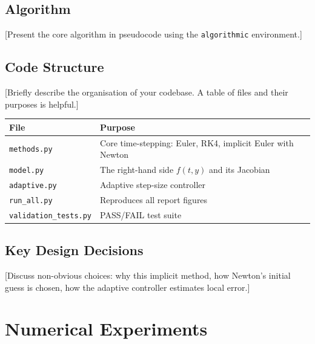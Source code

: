 \documentclass[11pt,a4paper]{article}
\theoremstyle{definition}
\theoremstyle{remark}
\begin{document}
\subsection{Algorithm}
[Present the core algorithm in pseudocode using the \texttt{algorithmic}
environment.]

\begin{algorithm}[H]
\caption{[Your method name]}
\label{alg:main}
\begin{algorithmic}[1]
\State [Step 1]
    \If{[condition]}
        \State [Action]
    \EndIf
\EndFor
\State \Return [result]
\end{algorithmic}
\end{algorithm}

\subsection{Code Structure}
[Briefly describe the organisation of your codebase. A table of files and their
purposes is helpful.]

\begin{table}[H]
\centering
\begin{tabular}{ll}
\toprule
\textbf{File} & \textbf{Purpose} \\
\midrule
\texttt{methods.py} & Core time-stepping: Euler, RK4, implicit Euler with Newton \\
\texttt{model.py} & The right-hand side $f(t,y)$ and its Jacobian \\
\texttt{adaptive.py} & Adaptive step-size controller \\
\texttt{run\_all.py} & Reproduces all report figures \\
\texttt{validation\_tests.py} & PASS/FAIL test suite \\
\bottomrule
\end{tabular}
\end{table}

\subsection{Key Design Decisions}
[Discuss non-obvious choices: why this implicit method, how Newton's initial
guess is chosen, how the adaptive controller estimates local error.]

\newpage
\section{Numerical Experiments}
\end{document}
